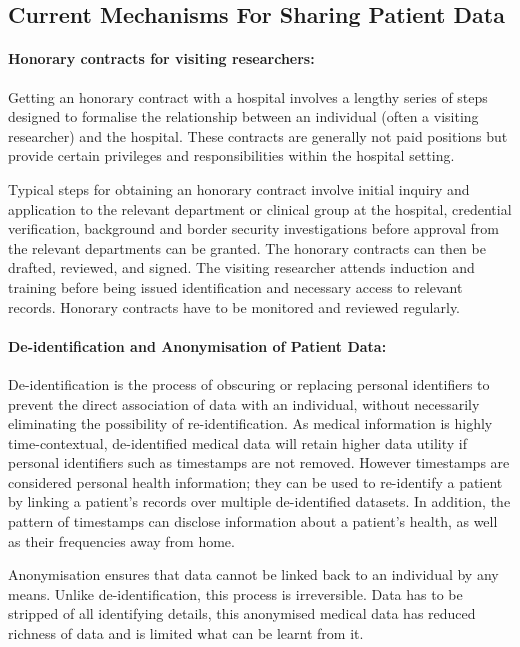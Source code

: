 \documentclass[11pt]{article}
\begin{document}
\subsection{Current Mechanisms For Sharing Patient Data}

\paragraph{Honorary contracts for visiting researchers:}

Getting an honorary contract with a hospital involves a lengthy series of steps designed to formalise the relationship between an individual (often a visiting researcher) and the hospital. These contracts are generally not paid positions but provide certain privileges and responsibilities within the hospital setting. 

Typical steps for obtaining an honorary contract involve initial inquiry and application to the relevant department or clinical group at the hospital, credential verification, background and border security investigations before approval from the relevant departments can be granted. The honorary contracts can then be drafted, reviewed, and signed. The visiting researcher attends induction and training before being issued identification and necessary access to relevant records. Honorary contracts have to be monitored and reviewed regularly. 

\paragraph{De-identification and Anonymisation of Patient Data:}
De-identification is the process of obscuring or replacing personal identifiers to prevent the direct association of data with an individual, without necessarily eliminating the possibility of re-identification. As medical information is highly time-contextual, de-identified medical data will retain higher data utility if personal identifiers such as timestamps are not removed. However timestamps are considered personal health information; they can be used to re-identify a patient by linking a patient's records over multiple de-identified datasets. In addition, the pattern of timestamps can disclose information about a patient's health, as well as their frequencies away from home.

Anonymisation ensures that data cannot be linked back to an individual by any means. Unlike de-identification, this process is irreversible. Data has to be stripped of all identifying details, this anonymised medical data has reduced richness of data and is limited what can be learnt from it. 
\end{document}
